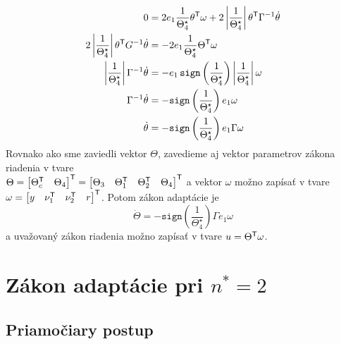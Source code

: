 \documentclass[a4paper, 10pt, ]{article}
\begin{document}
\begin{subequations}
	\begin{align}
    	0 &= 2 e_1 \frac{1}{\Theta_4^\star} \theta^{\mathsf{T}} \omega + 2 \left| \frac{1}{\Theta_4^\star} \right| \theta^{\mathsf{T}} \Gamma^{-1} \dot{\theta} \\
    	2 \left| \frac{1}{\Theta_4^\star} \right| \theta^{\mathsf{T}} G^{-1} \dot{\theta} &= - 2 e_1 \frac{1}{\Theta_4^\star} \Theta^{\mathsf{T}} \omega \\
    	\left| \frac{1}{\Theta_4^\star} \right| \Gamma^{-1} \dot{\theta} &= - e_1 \, \texttt{sign}\left(\frac{1}{\Theta_4^\star}\right) \left| \frac{1}{\Theta_4^\star} \right| \omega \\
    	\Gamma^{-1} \dot{\theta} &= - \texttt{sign}\left(\frac{1}{\Theta_4^\star}\right) e_1 \omega \\
    	\dot{\theta} &= - \texttt{sign}\left(\frac{1}{\Theta_4^\star}\right) e_1 \Gamma \omega
	\end{align}
\end{subequations}
Rovnako ako sme zaviedli vektor $\Theta$, zavedieme aj vektor parametrov zákona riadenia v tvare \\ $\Theta = \begin{bmatrix} \Theta_c^{\mathsf{T}} & \Theta_4 \end{bmatrix}^{\mathsf{T}} = \begin{bmatrix} {\Theta}_3 & \Theta_1^{\mathsf{T}} & \Theta_2^{\mathsf{T}} & \Theta_4 \end{bmatrix}^{\mathsf{T}}$ a vektor $\omega$ možno zapísať v tvare $\omega = \begin{bmatrix} y & \nu_1^{\mathsf{T}} & \nu_2^{\mathsf{T}} & r \end{bmatrix}^{\mathsf{T}}$. Potom zákon adaptácie je
\begin{equation}
	\dot{\Theta} = - \texttt{sign}\left(\frac{1}{\Theta_4^\star}\right) \Gamma e_1 \omega
\end{equation}
a uvažovaný zákon riadenia možno zapísať v tvare $u = \Theta^{\mathsf{T}} \omega$.














\section{Zákon adaptácie pri $n^* = 2$}



\subsection{Priamočiary postup}
\end{document}
